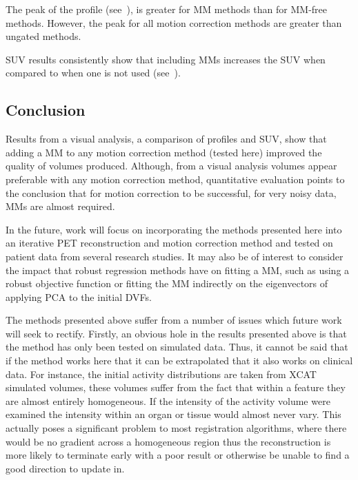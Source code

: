             The peak of the profile (see~), is greater for \gls{MM} methods than for \gls{MM}-free methods. However, the peak for all motion correction methods are greater than ungated methods.
             
            \gls{SUV} results consistently show that including \glspl{MM} increases the \gls{SUV} when compared to when one is not used (see~).
        
        \subsection{Conclusion} \label{sec:comparison_of_motion_correction_methods_incorporating_motion_modelling_for_pet_ct_using_a_single_breath_hold_attenuation_map_conclusions}
            Results from a visual analysis, a comparison of profiles and \gls{SUV}, show that adding a \gls{MM} to any motion correction method (tested here) improved the quality of volumes produced. Although, from a visual analysis volumes appear preferable with any motion correction method, quantitative evaluation points to the conclusion that for motion correction to be successful, for very noisy data, \glspl{MM} are almost required.
            
            In the future, work will focus on incorporating the methods presented here into an iterative \gls{PET} reconstruction and motion correction method and tested on patient data from several research studies. It may also be of interest to consider the impact that robust regression methods have on fitting a \gls{MM}, such as using a robust objective function or fitting the \gls{MM} indirectly on the eigenvectors of applying \gls{PCA} to the initial \glspl{DVF}.
    
        The methods presented above suffer from a number of issues which future work will seek to rectify. Firstly, an obvious hole in the results presented above is that the method has only been tested on simulated data. Thus, it cannot be said that if the method works here that it can be extrapolated that it also works on clinical data. For instance, the initial activity distributions are taken from \gls{XCAT} simulated volumes, these volumes suffer from the fact that within a feature they are almost entirely homogeneous. If the intensity of the activity volume were examined the intensity within an organ or tissue would almost never vary. This actually poses a significant problem to most registration algorithms, where there would be no gradient across a homogeneous region thus the reconstruction is more likely to terminate early with a poor result or otherwise be unable to find a good direction to update in.
        
